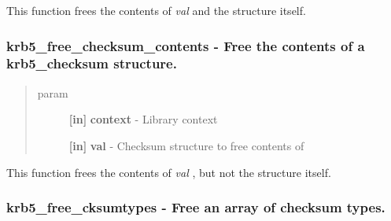 \documentclass[letterpaper,10pt,english]{sphinxmanual}
\begin{document}
This function frees the contents of \emph{val} and the structure itself.


\subsubsection{krb5\_free\_checksum\_contents -  Free the contents of a krb5\_checksum structure.}
\label{appdev/refs/api/krb5_free_checksum_contents:krb5-free-checksum-contents-free-the-contents-of-a-krb5-checksum-structure}\label{appdev/refs/api/krb5_free_checksum_contents::doc}

\begin{fulllineitems}
\label{appdev/refs/api/krb5_free_checksum_contents:krb5_free_checksum_contents}
\end{fulllineitems}

\begin{quote}\begin{description}
\item[{param}] \leavevmode
\textbf{{[}in{]}} \textbf{context} - Library context

\textbf{{[}in{]}} \textbf{val} - Checksum structure to free contents of

\end{description}\end{quote}

This function frees the contents of \emph{val} , but not the structure itself.


\subsubsection{krb5\_free\_cksumtypes -  Free an array of checksum types.}
\label{appdev/refs/api/krb5_free_cksumtypes:krb5-free-cksumtypes-free-an-array-of-checksum-types}\label{appdev/refs/api/krb5_free_cksumtypes::doc}

\begin{fulllineitems}
\label{appdev/refs/api/krb5_free_cksumtypes:krb5_free_cksumtypes}
\end{fulllineitems}
\end{document}
